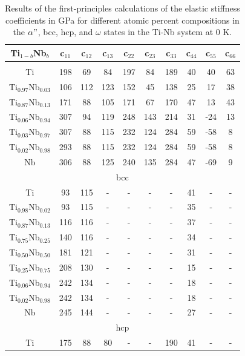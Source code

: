 \newpage
\begin{longtable}[H]{ c c c c c c c c c c }
	\caption{Results of the first-principles calculations of the elastic stiffness coefficients in GPa for different atomic percent compositions in the $\alpha"$, bcc, hcp, and $\omega$  states in the Ti-Nb system at 0 K.} 	\label{Ch7-table:tinbdata} \\
	\hline
	Ti$_{1-b}$Nb$_b$ & c$_{11}$ & c$_{12}$ & c$_{13}$ & c$_{22}$ & c$_{23}$ & c$_{33}$ & c$_{44}$ & c$_{55}$ & c$_{66}$\\
	\hline
	\endhead
	\hline
	\endfoot
	\multicolumn{10}{c}{$\alpha"$}\\
	\hline
	Ti & 198 & 69 & 84 & 197 & 84 & 189 & 40 & 40 & 63 \\		
	Ti$_{0.97}$Nb$_{0.03}$ & 106 & 112 & 123 & 152 & 45 & 138 & 25 & 17 & 38 \\
	Ti$_{0.87}$Nb$_{0.13}$ & 171 & 88 & 105 & 171 & 67 & 170 & 47 & 13 & 43 \\
	Ti$_{0.06}$Nb$_{0.94}$ & 307 & 94 & 119 & 248 & 143 & 214 & 31 & -24 & 13 \\
	Ti$_{0.03}$Nb$_{0.97}$ & 307 & 88 & 115 & 232 & 124 & 284 & 59 & -58 & 8 \\
	Ti$_{0.02}$Nb$_{0.98}$ & 293 & 88 & 115 & 232 & 124 & 284 & 59 & -58 & 8 \\
	Nb & 306 & 88 & 125 & 240 & 135 & 284 & 47 & -69 & 9 \\
	\hline
	\multicolumn{10}{c}{bcc}\\
	\hline
	Ti & 93 & 115 & - & - & - & - & 41 & - & - \\		
	Ti$_{0.98}$Nb$_{0.02}$ & 93 & 115 & - & - & - & - & 35 & - & - \\
	Ti$_{0.87}$Nb$_{0.13}$ & 116 & 116 & - & - & - & - & 37 & - & - \\
	Ti$_{0.75}$Nb$_{0.25}$ & 140 & 116 & - & - & - & - & 34 & - & - \\
	Ti$_{0.50}$Nb$_{0.50}$ & 181 & 121 & - & - & - & - & 31 & - & - \\
	Ti$_{0.25}$Nb$_{0.75}$ & 208 & 130 & - & - & - & - & 15 & - & - \\
	Ti$_{0.06}$Nb$_{0.94}$ & 242 & 134 & - & - & - & - & 18 & - & - \\
	Ti$_{0.02}$Nb$_{0.98}$ & 242 & 134 & - & - & - & - & 18 & - & - \\
	Nb & 245 & 144 & - & - & - & - & 27 & - & - \\
	\hline
	\multicolumn{10}{c}{hcp}\\
	\hline
	Ti & 175 & 88 & 80 & - & - & 190 & 41 & - & - \\		

\end{longtable}
